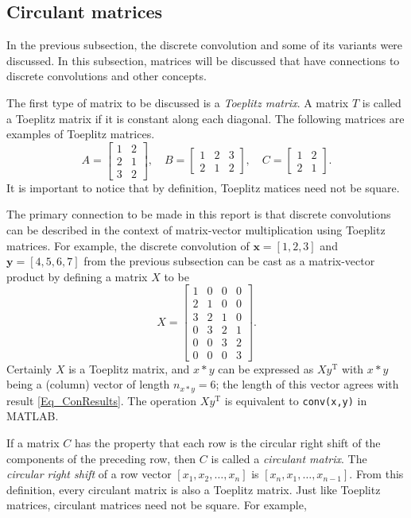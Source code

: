 \documentclass[12pt]{article}
\newcommand{\trans}{\mathrm{T}}	%
\begin{document}
\subsection{Circulant matrices} \label{Circulant matrices}
In the previous subsection, the discrete convolution and some of its variants were discussed. In this subsection, matrices will be discussed that have connections to discrete convolutions and other concepts. \par 
The first type of matrix to be discussed is a \textit{Toeplitz matrix}. A matrix $T$ is called a Toeplitz matrix if it is constant along each diagonal. The following matrices are examples of Toeplitz matrices.
\[A = \begin{bmatrix}
1 & 2 \\
2 & 1 \\
3 & 2
\end{bmatrix}, \quad 
B = \begin{bmatrix}
1 & 2 & 3 \\
2 & 1 & 2 
\end{bmatrix}, \quad 
C = \begin{bmatrix}
1 &  2 \\
2 & 1
\end{bmatrix}.\]
It is important to notice that by definition, Toeplitz matices need not be square. \par 
The primary connection to be made in this report is that discrete convolutions can be described in the context of matrix-vector multiplication using Toeplitz matrices. For example, the discrete convolution of $\mathbf{x} = [1,2,3]$ and $\mathbf{y} = [4,5,6,7]$ from the previous subsection can be cast as a matrix-vector product by defining a matrix $X$ to be
\[X = \begin{bmatrix}
1 & 0 & 0 & 0 \\
2 & 1 & 0 & 0 \\
3 & 2 & 1 & 0 \\
0 & 3 & 2 & 1 \\
0 & 0 & 3 & 2 \\
0 & 0 & 0 & 3
\end{bmatrix}.\]
Certainly $X$ is a Toeplitz matrix, and $x*y$ can be expressed as $Xy^\trans$ with $x*y$ being a (column) vector of length $n_{x*y} = 6$; the length of this vector agrees with result \eqref{Eq_ConResults}. The operation $Xy^\trans$ is equivalent to \texttt{conv(x,y)} in MATLAB. \par 
If a matrix $C$ has the property that each row is the circular right shift of the components of the preceding row, then $C$ is called a \textit{circulant matrix}. The \textit{circular right shift} of a row vector $[x_1,x_2,\ldots,x_n]$ is $[x_n,x_1,\ldots,x_{n-1}]$. From this definition, every circulant matrix is also a Toeplitz matrix. Just like Toeplitz matrices, circulant matrices need not be square. For example,
\end{document}

